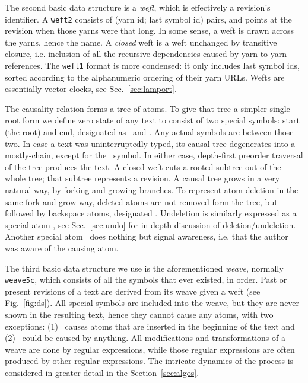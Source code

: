 \documentclass{acm_proc_article-sp}
\begin{document}
The second basic data structure is a \emph{weft}, which is effectively a revision's identifier.
A {\tt weft2} consists of (yarn id; last symbol id) pairs, and points at the revision when those yarns were that long. 
In some sense, a weft is drawn across the yarns, hence the name.
A \emph{closed} weft is a weft unchanged by transitive closure, i.e. inclusion of all the recursive dependencies caused by yarn-to-yarn references.
The {\tt weft1} format is more condensed: it only includes last symbol ids, sorted according to the alphanumeric ordering of their yarn URLs.
Wefts are essentially vector clocks, see Sec.~\ref{sec:lamport}.

The causality relation forms a tree of atoms.
To give that tree a simpler single-root form we define zero state of any text to consist of two special symbols: start (the root) and end, designated as \aum ~and \eoa.
Any actual symbols are between those two.
In case a text was uninterruptedly typed, its causal tree degenerates into a mostly-chain, except for the \eoa ~symbol.
In either case, depth-first preorder traversal of the tree produces the text.
A closed weft cuts a rooted subtree out of the whole tree; that subtree represents a revision.
A causal tree grows in a very natural way, by forking and growing branches.
To represent atom deletion in the same fork-and-grow way, deleted atoms are not removed form the tree, but followed by backspace atoms, designated \bsp. 
Undeletion is similarly expressed as a special atom \cnc, see Sec.~\ref{sec:undo} for in-depth discussion of deletion/undeletion.
Another special atom \zero ~does nothing but signal awareness, i.e. that the author was aware of the causing atom.

The third basic data structure we use is the aforementioned \emph{weave}, normally {\tt weave5c}, which consists of all the symbols that ever existed, in order. 
Past or present revisions of a text are derived from its weave given a weft (see Fig.~\ref{fig:ds}).
All special symbols are included into the weave, but they are never shown in the resulting text, hence they cannot cause any atoms, with two exceptions: (1) \aum ~causes atoms that are inserted in the beginning of the text and (2) \zero ~could be caused by anything.
All modifications and transformations of a weave are done by regular expressions, while those regular expressions are often produced by other regular expressions.
The intricate dynamics of the process is considered in greater detail in the Section~\ref{sec:algos}.
\end{document}
